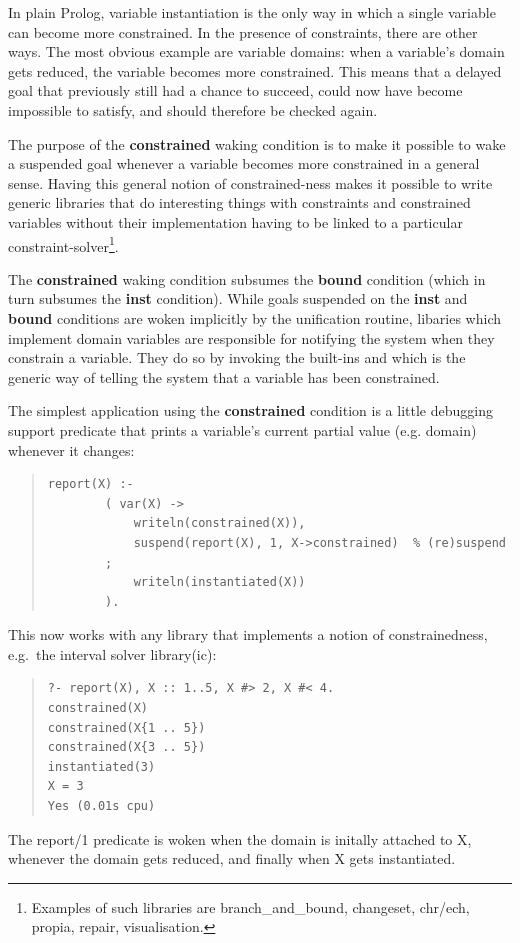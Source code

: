 In plain Prolog, variable instantiation is the only way in which a single
variable can become more constrained.  In the presence of constraints,
there are other ways. The most obvious example are variable domains:
when a variable's domain gets reduced, the variable becomes more
constrained. This means that a delayed goal that previously still had
a chance to succeed, could now have become impossible to satisfy,
and should therefore be checked again.

The purpose of the {\bf constrained} waking condition is to make it
possible to wake a suspended goal whenever a variable becomes more
constrained in a general sense. Having this general notion
of constrained-ness makes it possible to write generic libraries
that do interesting things with constraints and constrained variables
without their implementation having to be linked to a particular
constraint-solver\footnote{Examples of such libraries are branch_and_bound,
changeset, chr/ech, propia, repair, visualisation.}.

The {\bf constrained} waking condition subsumes the {\bf bound} condition
(which in turn subsumes the {\bf inst} condition). 
While goals suspended on the {\bf inst} and {\bf bound} conditions
are woken implicitly by the unification routine, libaries which implement
domain variables are responsible for notifying the system when they
constrain a variable. They do so by invoking the built-ins
and 
which is the generic way of telling the system that a variable has been
constrained.

The simplest application using the {\bf constrained} condition is a little
debugging support predicate that prints a variable's current partial value
(e.g. domain) whenever it changes:
\begin{quote}\begin{verbatim}
report(X) :-
        ( var(X) ->
            writeln(constrained(X)),
            suspend(report(X), 1, X->constrained)  % (re)suspend
        ;
            writeln(instantiated(X))
        ).
\end{verbatim}\end{quote}
This now works with any library that implements a notion of constrainedness,
e.g.\ the interval solver library(ic):
\begin{quote}\begin{verbatim}
?- report(X), X :: 1..5, X #> 2, X #< 4.
constrained(X)
constrained(X{1 .. 5})
constrained(X{3 .. 5})
instantiated(3)
X = 3
Yes (0.01s cpu)
\end{verbatim}\end{quote}
The report/1 predicate is woken when the domain is initally attached to X,
whenever the domain gets reduced, and finally when X gets instantiated.



